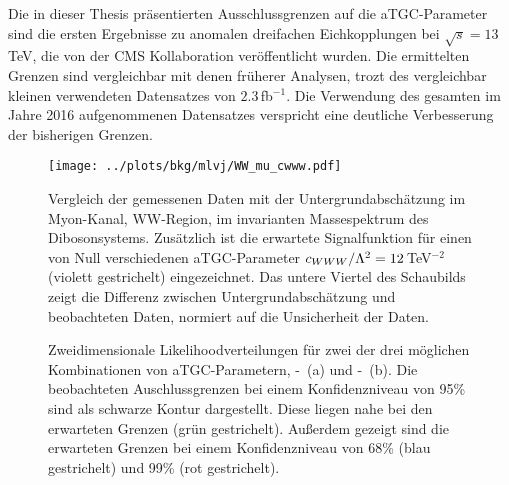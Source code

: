 Die in dieser Thesis präsentierten Ausschlussgrenzen auf die aTGC-Parameter sind die ersten Ergebnisse zu anomalen dreifachen Eichkopplungen bei $\sqrt{s}=13$\,TeV, die von der CMS Kollaboration veröffentlicht wurden. Die ermittelten Grenzen sind vergleichbar mit denen früherer Analysen, trozt des vergleichbar kleinen verwendeten Datensatzes von $2.3$\,fb$^{-1}$. Die Verwendung des gesamten im Jahre 2016 aufgenommenen Datensatzes verspricht eine deutliche Verbesserung der bisherigen Grenzen.


\begin{figure}
    \centering
    \resizebox{0.8\columnwidth}{!}
    {%
    \texttt{[image: ../plots/bkg/mlvj/WW\_mu\_cwww.pdf]}
    \caption[Vergleich der gemessenen Daten mit der Untergrundabschätzung sowie zweidimensionale Ausschlussgrenzen auf \Tccw -\Tcb]{Vergleich der gemessenen Daten mit der Untergrundabschätzung im Myon-Kanal, WW-Region, im invarianten Massespektrum des Dibosonsystems. Zusätzlich ist die erwartete Signalfunktion für einen von Null verschiedenen aTGC-Parameter $c_{WWW}/\Lambda^2=12$\,TeV$^{-2}$ (violett gestrichelt) eingezeichnet. Das untere Viertel des Schaubilds zeigt die Differenz zwischen Untergrundabschätzung und beobachteten Daten, normiert auf die Unsicherheit der Daten.}
    \label{fig:intro_ger:WW}
    }
\end{figure}

\begin{figure}
	\centering
	\caption[Zweidimensionale Likelihoodverteilungen für zwei mögliche Kombinationen von aTGC-Parametern]{Zweidimensionale Likelihoodverteilungen für zwei der drei möglichen Kombinationen von aTGC-Parametern, \Tcwww -\Tcb \ (a) und \Tccw -\Tcb \ (b). Die beobachteten Auschlussgrenzen bei einem Konfidenzniveau von 95\% sind als schwarze Kontur dargestellt. Diese liegen nahe bei den erwarteten Grenzen (grün gestrichelt). Außerdem gezeigt sind die erwarteten Grenzen bei einem Konfidenzniveau von 68\% (blau gestrichelt) und 99\% (rot gestrichelt).}
	\label{fig:intro_ger:2d}	
\end{figure}
